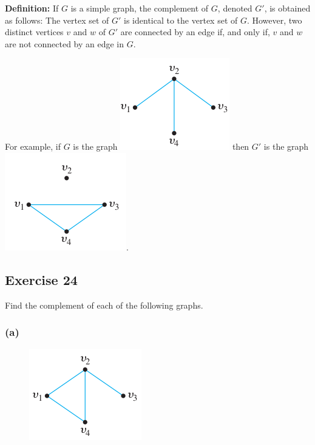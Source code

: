 \documentclass[14pt]{extarticle}
\newcommand{\cy}{\color{cyan}}
\begin{document}
\begin{tcolorbox}[colframe=cyan]
{\bf \cy Definition:} If \(G\) is a simple graph, the complement of \(G\), denoted \(G'\), is obtained as follows: 
The vertex set of \(G'\) is identical to the vertex set of \(G\). However, two distinct vertices \(v\) and \(w\) of \(G'\) 
are connected by an edge if, and only if, \(v\) and \(w\) are not connected by an edge in \(G\). 

For example, if \(G\) is the graph \includegraphics[scale=0.5]{../images/10.1.24.1.png} then \(G'\) is the graph 
\includegraphics[scale=0.5]{../images/10.1.24.2.png}.
\end{tcolorbox}

\subsection{Exercise 24}
Find the complement of each of the following graphs.

\subsubsection{(a)}
\begin{figure}[ht!]
\centering
\includegraphics[scale=0.5]{../images/10.1.24.a.1.png}
\end{figure}
\end{document}

